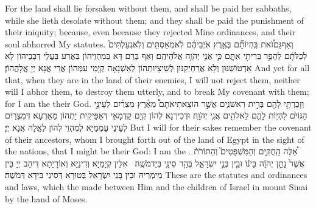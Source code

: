{For the land shall lie forsaken without them, and shall be paid her sabbaths, while she lieth desolate without them; and they shall be paid the punishment of their iniquity; because, even because they rejected Mine ordinances, and their soul abhorred My statutes.}{}
{וְאַף\maqqaf גַּם\maqqaf זֹ֠את בִּֽהְיוֹתָ֞ם בְּאֶ֣רֶץ אֹֽיְבֵיהֶ֗ם לֹֽא\maqqaf מְאַסְתִּ֤ים וְלֹֽא\maqqaf גְעַלְתִּים֙ לְכַלֹּתָ֔ם לְהָפֵ֥ר בְּרִיתִ֖י אִתָּ֑ם כִּ֛י אֲנִ֥י יְהֹוָ֖ה אֱלֹהֵיהֶֽם׃}
{וְאַף בְּרַם דָּא בְּמִהְוֵיהוֹן בַּאֲרַע בַּעֲלֵי דְּבָבֵיהוֹן לָא אַרְטוֹשִׁנּוּן וְלָא אֲרַחֵיקִנּוּן לְשֵׁיצָיוּתְהוֹן לְאַשְׁנָאָה קְיָמִי עִמְּהוֹן אֲרֵי אֲנָא יְיָ אֱלָהֲהוֹן׃}
{And yet for all that, when they are in the land of their enemies, I will not reject them, neither will I abhor them, to destroy them utterly, and to break My covenant with them; for I am the \lord\space their God.}{}
{וְזָכַרְתִּ֥י לָהֶ֖ם בְּרִ֣ית רִאשֹׁנִ֑ים אֲשֶׁ֣ר הוֹצֵֽאתִי\maqqaf אֹתָם֩ מֵאֶ֨רֶץ מִצְרַ֜יִם לְעֵינֵ֣י הַגּוֹיִ֗ם לִהְי֥וֹת לָהֶ֛ם לֵאלֹהִ֖ים אֲנִ֥י יְהֹוָֽה׃}
{וּדְכִירְנָא לְהוֹן קְיָם קַדְמָאֵי דְּאַפֵּיקִית יָתְהוֹן מֵאַרְעָא דְּמִצְרַיִם לְעֵינֵי עַמְמַיָּא לְמִהְוֵי לְהוֹן לֶאֱלָהּ אֲנָא יְיָ׃}
{But I will for their sakes remember the covenant of their ancestors, whom I brought forth out of the land of Egypt in the sight of the nations, that I might be their God: I am the \lord.}{}
{אֵ֠לֶּה הַֽחֻקִּ֣ים וְהַמִּשְׁפָּטִים֮ וְהַתּוֹרֹת֒ אֲשֶׁר֙ נָתַ֣ן יְהֹוָ֔ה בֵּינ֕וֹ וּבֵ֖ין בְּנֵ֣י יִשְׂרָאֵ֑ל בְּהַ֥ר סִינַ֖י בְּיַד\maqqaf מֹשֶֽׁה׃ \petucha }
{אִלֵּין קְיָמַיָּא וְדִינַיָּא וְאוֹרָיָתָא דִּיהַב יְיָ בֵּין מֵימְרֵיהּ וּבֵין בְּנֵי יִשְׂרָאֵל בְּטוּרָא דְּסִינַי בִּידָא דְּמֹשֶׁה׃}
{These are the statutes and ordinances and laws, which the \lord\space made between Him and the children of Israel in mount Sinai by the hand of Moses.}{}
\newperek
{}
